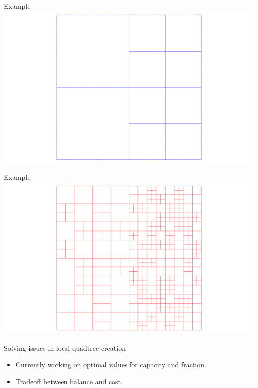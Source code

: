 \documentclass{beamer}
\begin{document}
\begin{frame}{Example}
    \centering
    \includegraphics[width=\textwidth]{figures/ByP_Globals}
\end{frame}
\begin{frame}{Example}
    \centering
    \includegraphics[width=\textwidth]{figures/ByP_Locals}
\end{frame}

\begin{frame}{Solving issues in local quadtree creation}
    \begin{itemize}
        \item Currently working on optimal values for capacity and fraction.
        \item Tradeoff between balance and cost.
    \end{itemize}
\end{frame}
\end{document}
